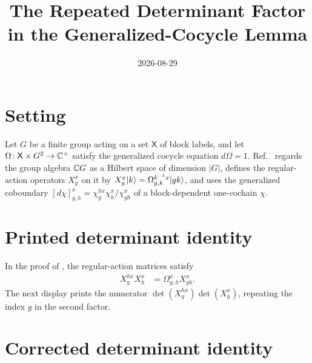 \documentclass{article}
\title{The Repeated Determinant Factor in the Generalized-Cocycle Lemma}
\author{}
\date{2026-08-29}
\begin{document}
\maketitle
{}

\section{Setting}

Let $G$ be a finite group acting on a set $\mathsf X$ of block labels, and let
$\Omega\colon\mathsf X\times G^2\to\mathbb{C}^\times$ satisfy the generalized cocycle
equation $d\Omega=1$.
Ref.~\cite[Lemma~\texttt{lemma:G\_cocycle}]{FrancoRubio2025MPUGauging} regards
the group algebra $\mathbb{C} G$ as a Hilbert space of dimension $|G|$, defines the
regular-action operators $X^x_g$ on it by
$X^x_g|k\rangle=\Omega^{k^{-1}x}_{g,k}|gk\rangle$, and uses the generalized
coboundary $[d\chi]^x_{g,h}=\chi^{h x}_g\chi^x_h/\chi^x_{gh}$ of a
block-dependent one-cochain $\chi$.

\section{Printed determinant identity}

In the proof of \cite[Lemma~\texttt{lemma:G\_cocycle}]{FrancoRubio2025MPUGauging},
the regular-action matrices satisfy
\begin{align}
    X^{h x}_g X^x_h
        &=\Omega^x_{g,h}X^x_{gh}.
    \label{eq:fbc25_generalized_cocycle_operator}
\end{align}
The next display prints the numerator
$\det(X^{h x}_g)\det(X^x_g)$, repeating the index $g$ in the second factor.

\section{Corrected determinant identity}
\end{document}
